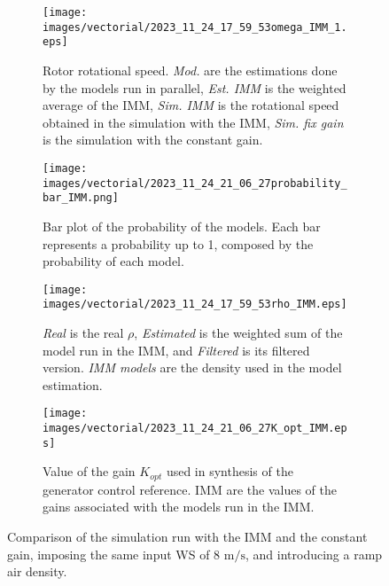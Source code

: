 \begin{figure}[!htbp]
  \begin{subfigure}{0.49\columnwidth}
    \centering
    \texttt{[image: images/vectorial/2023\_11\_24\_17\_59\_53omega\_IMM\_1.eps]}
    \caption{Rotor rotational speed. \textit{Mod.} are the estimations done by the models run in parallel, \textit{Est. IMM} is the weighted average of the IMM, \textit{Sim. IMM} is the rotational speed obtained in the simulation with the IMM, \textit{Sim. fix gain} is the simulation with the constant gain.}
    \label{fig:fig_omega_IMM_1}
  \end{subfigure}
  \begin{subfigure}{0.49\columnwidth}
    \centering
    \texttt{[image: images/vectorial/2023\_11\_24\_21\_06\_27probability\_bar\_IMM.png]}
    \caption{Bar plot of the probability of the models. Each bar represents a probability up to 1, composed by the probability of each model.}
    \label{fig:fig_probability_IMM}
  \end{subfigure}
  \begin{subfigure}{0.49\columnwidth}
    \centering
    \texttt{[image: images/vectorial/2023\_11\_24\_17\_59\_53rho\_IMM.eps]}
    \caption{\textit{Real} is the real $\rho$, \textit{Estimated} is the weighted sum of the model run in the IMM, and \textit{Filtered} is its filtered version. \textit{IMM models} are the density used in the model estimation.}
    \label{fig:fig_rho_IMM}
  \end{subfigure}
  \begin{subfigure}{0.49\columnwidth}
    \centering
    \texttt{[image: images/vectorial/2023\_11\_24\_21\_06\_27K\_opt\_IMM.eps]}
    \caption{Value of the gain $K_{opt}$ used in synthesis of the generator control reference. IMM are the values of the gains associated with the models run in the IMM.}
    \label{fig:fig_K_IMM}
  \end{subfigure}
  \caption{Comparison of the simulation run with the IMM and the constant gain, imposing the same input WS of 8 $\si{\meter\per\second}$, and introducing a ramp air density.}
  \label{fig:fig_IMM_sim_const_WS}
\end{figure}

